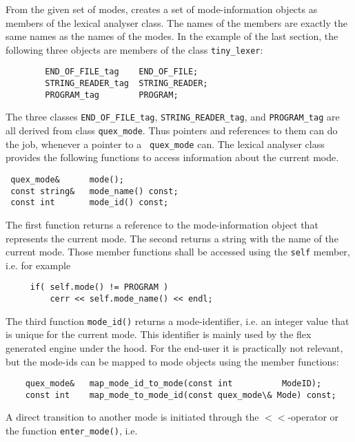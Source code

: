 From the given set of modes, {\quex} creates a set of mode-information objects
as members of the lexical analyser class. The names of the members are exactly
the same names as the names of the modes. In the example of the last section,
the following three objects are members of the class {\tt tiny\_lexer}:

\begin{lstlisting}
        END_OF_FILE_tag    END_OF_FILE;  
        STRING_READER_tag  STRING_READER; 
        PROGRAM_tag        PROGRAM;       
\end{lstlisting}

The three classes {\tt END\_OF\_FILE\_tag}, {\tt STRING\_READER\_tag}, and
{\tt PROGRAM\_tag} are all derived from class {\tt quex\_mode}. Thus pointers
and references to them can do the job, whenever a pointer to a {\tt
  quex\_mode} can. The lexical analyser class provides the following functions
to access information about the current mode.


\begin{lstlisting}
 quex_mode&      mode(); 
 const string&   mode_name() const; 
 const int       mode_id() const; 
\end{lstlisting}

The first function returns a reference to the mode-information object that
represents the current mode. The second returns a
string with the name of the current mode. Those member functions shall be
accessed using the {\tt self} member, i.e. for example

\begin{lstlisting}
     if( self.mode() != PROGRAM )
         cerr << self.mode_name() << endl;      
\end{lstlisting}

The third function {\tt mode\_id()} returns a mode-identifier, i.e. an integer
value that is unique for the current mode. This identifier is mainly used by
the flex generated engine under the hood. For the end-user it is practically
not relevant, but the mode-ids can be mapped to mode objects using the 
member functions:

\begin{lstlisting}
    quex_mode&   map_mode_id_to_mode(const int          ModeID);  
    const int    map_mode_to_mode_id(const quex_mode\& Mode) const;
\end{lstlisting}

A direct transition to another mode is initiated through the $<$$<$-operator or
the function {\tt enter\_mode()}, i.e.

